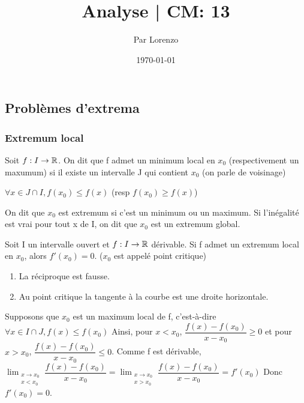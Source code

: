 \documentclass[a4paper, 12pt]{article}
\title{Analyse | CM: 13}
\author{Par Lorenzo}
\date{\today}
\begin{document}
\maketitle

\subsection{Problèmes d'extrema}

\subsubsection{Extremum local}

\begin{definition}
    Soit $f: I \rightarrow \mathbb{R}$. On dit que f admet un minimum local en $x_0$
    (respectivement un maxumum) si il existe un intervalle J qui contient $x_0$ (on parle de voisinage)
    
    $\forall x \in J \cap I, f(x_0) \leq f(x)$ (resp $f(x_0) \geq f(x)$)
    
    On dit que $x_0$ est extremum si c'est un minimum ou un maximum.
    Si l'inégalité est vrai pour tout x de I, on dit que $x_0$ est un extremum global.
\end{definition}


\begin{theorem}
    Soit I un intervalle ouvert et $f: I \rightarrow \mathbb{R}$ dérivable.
    Si f admet un extremum local en $x_0$, alors $f'(x_0) = 0$. ($x_0$ est appelé point critique)
\end{theorem}

\begin{remark}
    \begin{enumerate}
        \item La réciproque est fausse.
        \item Au point critique la tangente à la courbe est une droite horizontale.
    \end{enumerate}
\end{remark}

\begin{demonstration}
    Supposons que $x_0$ est un maximum local de f, c'est-à-dire $\forall x \in I \cap J, f(x) \leq f(x_0)$ Ainsi,
    pour $x \lt x_0$, $\dfrac{f(x) - f(x_0)}{x - x_0} \geq 0$ et pour $x \gt x_0$, $\dfrac{f(x) - f(x_0)}{x - x_0} \leq 0$.
    Comme f est dérivable, $\lim_{\substack{x \to x_0 \\ x \lt x_0}} \dfrac{f(x) - f(x_0)}{x - x_0} = \lim_{\substack{x \to x_0 \\ x \gt x_0}} \dfrac{f(x) - f(x_0)}{x - x_0} = f'(x_0)$
    Donc $f'(x_0) = 0$.
\end{demonstration}
\end{document}
